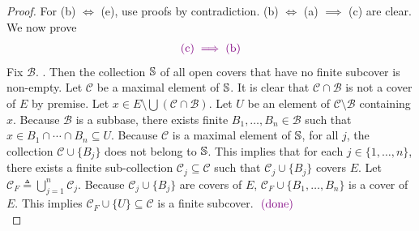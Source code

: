 \documentclass{report}
\begin{document}
\begin{proof}
For (b) $\iff$ (e), use proofs by contradiction. (b) $\iff$ (a) $\implies$ (c) are clear. We now prove
\begin{align*}
\vi{(\text{c})\implies (\text{b})}
\end{align*}
Fix $\mathcal{B}$. . Then the collection $\S$ of all open covers that have no finite subcover is non-empty. Let $\mathcal{C}$ be a maximal element of $\S$. It is clear that $\mathcal{C} \cap \mathcal{B}$ is not a cover of $E$ by premise. Let $x \in E \setminus \bigcup (\mathcal{C} \cap \mathcal{B})$. Let $U$ be an element of $\mathcal{C} \setminus \mathcal{B}$ containing $x$. Because $\mathcal{B}$ is a subbase, there exists finite $B_1, \dots, B_n \in \mathcal{B}$ such that $x \in B_1 \cap \cdots \cap B_n \subseteq U$. Because $\mathcal{C}$ is a maximal element of $\S$,  for all $j$, the collection $\mathcal{C} \cup \{B_j\}$ does not belong to $\S$. This implies that for each $j \in \{1, \dots, n\}$, there exists a finite sub-collection $\mathcal{C}_j \subseteq \mathcal{C}$ such that $\mathcal{C}_j \cup \{B_j\}$ covers $E$. Let $\mathcal{C}_F \triangleq \bigcup_{j=1}^n \mathcal{C}_j$. Because $\mathcal{C}_j \cup \{B_j\}$ are covers of $E$, $\mathcal{C}_F \cup \{B_1, \dots, B_n\}$ is a cover of $E$. This implies $\mathcal{C}_F \cup \{U\} \subseteq \mathcal{C}$ is a finite subcover. \CaC $\vdone$\\


\end{proof}
\end{document}
